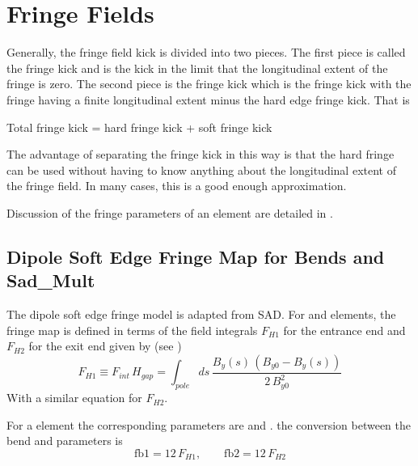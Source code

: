 \chapter{Fringe Fields}
\label{s:fringe.std}

Generally, the fringe field kick is divided into two pieces.  The first piece is called the  fringe kick and is the kick in the limit that the longitudinal extent of the fringe is
zero. The second piece is the  fringe kick which is the fringe kick with the fringe
having a finite longitudinal extent minus the hard edge fringe kick. That is
\begin{example}
  Total fringe kick = hard fringe kick + soft fringe kick
\end{example}
The advantage of separating the fringe kick in this way is that the hard fringe can be used without
having to know anything about the longitudinal extent of the fringe field. In many cases, this is a
good enough approximation.

Discussion of the fringe parameters of an element are detailed in .

\section{Dipole Soft Edge Fringe Map for Bends and Sad_Mult}
\label{s:fringe.bend.soft}

The dipole soft edge fringe model is adapted from SAD\cite{b:sad}. For  and 
elements, the fringe map is defined in terms of the field integrals $F_{H1}$ for the entrance end
and $F_{H2}$ for the exit end given by (see )
\begin{equation}
  F_{H1} \equiv F_{int} \, H_{gap} = \int_{pole} \! \! ds \, \frac{B_y(s) \, (B_{y0} - B_y(s))}
  {2 \, B_{y0}^2}
\end{equation}
With a similar equation for $F_{H2}$.  

For a  element the corresponding parameters are  and . the conversion between
the bend and  parameters is
\begin{equation}
  \text{fb1} = 12 \, F_{H1}, \qquad \text{fb2} = 12 \, F_{H2}
\end{equation}

